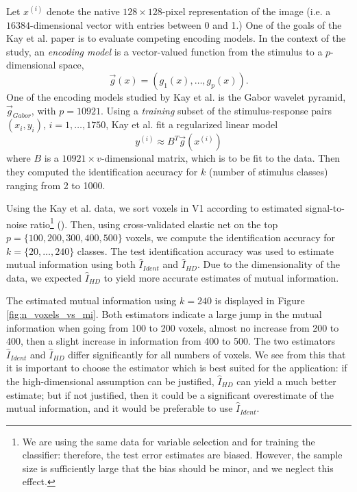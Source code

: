 Let $x^{(i)}$ denote the native $128 \times 128$-pixel representation
of the image (i.e. a $16384$-dimensional vector with entries between 0
and 1.)  One of the goals of the Kay et al. paper is to evaluate
competing encoding models.  In the context of the study,
an \emph{encoding model} is a vector-valued function from the stimulus
to a $p$-dimensional space,
\[
\vec{g}(x) = (g_1(x),\hdots, g_{p}(x)).
\]
One of the encoding models studied by Kay et al. is the Gabor wavelet pyramid,
$\vec{g}_{Gabor}$, with $p = 10921$.
Using a \emph{training} subset of the stimulus-response pairs $(x_i, y_i)$, $i = 1,\hdots, 1750$,
Kay et al. fit a regularized linear model
\[
y^{(i)} \approx B^T \vec{g}(x^{(i)})
\]
where $B$ is a $10921 \times v$-dimensional matrix, which is to be fit
to the data.  Then they computed the identification accuracy for $k$
(number of stimulus classes) ranging from 2 to 1000.

Using the Kay et al. data, we sort voxels in V1 according to estimated
signal-to-noise ratio\footnote{We are using the same data for variable
  selection and for training the classifier: therefore, the test error
  estimates are biased.  However, the sample size is sufficiently
  large that the bias should be minor, and we neglect this effect.}
(\cite{benjamini2013shuffle}).  Then, using cross-validated elastic
net on the top $p = \{100, 200, 300, 400, 500\}$ voxels, we compute
the identification accuracy for $k = \{20,\hdots, 240\}$ classes.  The
test identification accuracy was used to estimate mutual information
using both $\hat{I}_{Ident}$ and $\hat{I}_{HD}$.  Due to the
dimensionality of the data, we expected $\hat{I}_{HD}$ to yield more
accurate estimates of mutual information.

The estimated mutual information using $k = 240$ is displayed in
Figure \ref{fig:n_voxels_vs_mi}.  Both estimators indicate a large
jump in the mutual information when going from 100 to 200 voxels,
almost no increase from 200 to 400, then a slight increase in
information from 400 to 500.  The two estimators $\hat{I}_{Ident}$ and
$\hat{I}_{HD}$ differ significantly for all numbers of voxels. We see
from this that it is important to choose the estimator which is best
suited for the application: if the high-dimensional assumption can be
justified, $\hat{I}_{HD}$ can yield a much better estimate; but if not
justified, then it could be a significant overestimate of the mutual
information, and it would be preferable to use $\hat{I}_{Ident}$.

